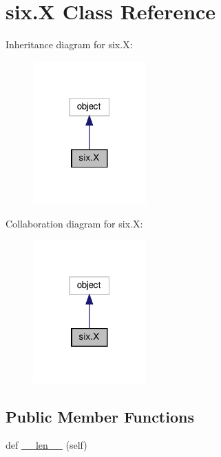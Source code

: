 \hypertarget{classsix_1_1X}{}\section{six.\+X Class Reference}
\label{classsix_1_1X}


Inheritance diagram for six.\+X\+:
\nopagebreak
\begin{figure}[H]
\begin{center}
\leavevmode
\includegraphics[width=123pt]{classsix_1_1X__inherit__graph}
\end{center}
\end{figure}


Collaboration diagram for six.\+X\+:
\nopagebreak
\begin{figure}[H]
\begin{center}
\leavevmode
\includegraphics[width=123pt]{classsix_1_1X__coll__graph}
\end{center}
\end{figure}
\subsection*{Public Member Functions}
\begin{DoxyCompactItemize}
\item 
def \hyperlink{classsix_1_1X_a2a0c740ba10f5e755bc23009dc42dc3f}{\+\_\+\+\_\+len\+\_\+\+\_\+} (self)
\end{DoxyCompactItemize}


